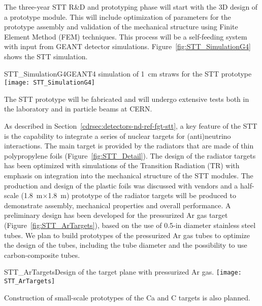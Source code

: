 The three-year STT R\&D and prototyping phase will start with the 3D
design of a prototype module.  This will include optimization of
parameters for the prototype assembly and validation of the mechanical
structure using Finite Element Method (FEM) techniques. This process
will be a self-feeding system with input from GEANT detector
simulations.  Figure~\ref{fig:STT_SimulationG4} shows the STT
simulation.  
\begin{cdrfigure}
{STT_SimulationG4}{GEANT4 simulation of 1~cm straws for the STT prototype}
\texttt{[image: STT\_SimulationG4]}
\end{cdrfigure}
The STT prototype will be fabricated and will undergo
extensive tests both in the laboratory and 
in particle beams at CERN.



As described in Section~\ref{cdrsec:detectors-nd-ref-fgt-stt}, a key
feature of the STT is the capability to integrate a series of
nuclear targets for (anti)neutrino interactions.  The main
target is provided by the radiators that are made of thin polypropylene foils
(Figure~\ref{fig:STT_Detail}).  The design of the radiator targets has
been optimized with simulations of the Transition Radiation (TR)
with emphasis on integration into the mechanical structure of
the STT modules.  The production and design of the plastic foils was
discussed with vendors and a half-scale
(1.8~m$\times$1.8~m) prototype of the radiator targets will be produced to demonstrate
assembly, mechanical properties and overall
performance.
A preliminary design has been developed for the
pressurized Ar gas target (Figure~\ref{fig:STT_ArTargets}), based on
the use of 0.5-in diameter stainless steel tubes.
We plan to build prototypes of the pressurized Ar gas tubes to 
optimize the design of the tubes, including the tube diameter
and the possibility to use carbon-composite tubes. 
\begin{cdrfigure}
{STT_ArTargets}{Design of the target plane with pressurized Ar gas.}
\texttt{[image: STT\_ArTargets]}
\end{cdrfigure}
Construction of small-scale prototypes of the Ca and C targets is also planned.


